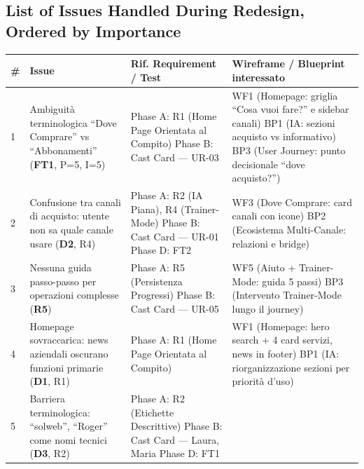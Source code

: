 ﻿\documentclass[11pt,a4paper]{article}
\begin{document}
\vspace{0.3cm}

\subsection*{List of Issues Handled During Redesign, Ordered by Importance}

\renewcommand{\arraystretch}{1.3}
\begin{longtable}{|p{0.8cm}|p{3.2cm}|p{3.3cm}|p{6.2cm}|}
\hline
\textbf{\#} & \textbf{Issue} & \textbf{Rif. Requirement / Test} & \textbf{Wireframe / Blueprint interessato} \\
\hline
\endhead
1 & Ambiguit\`a terminologica ``Dove Comprare'' vs ``Abbonamenti'' (\textbf{FT1}, P=5, I=5) 
& Phase A: R1 (Home Page Orientata al Compito) \newline Phase B: Cast Card --- UR-03
& WF1 (Homepage: griglia ``Cosa vuoi fare?'' e sidebar canali) \newline BP1 (IA: sezioni acquisto vs informativo) \newline BP3 (User Journey: punto decisionale ``dove acquisto?'') \\
\hline
2 & Confusione tra canali di acquisto: utente non sa quale canale usare (\textbf{D2}, R4) 
& Phase A: R2 (IA Piana), R4 (Trainer-Mode) \newline Phase B: Cast Card --- UR-01 \newline Phase D: FT2
& WF3 (Dove Comprare: card canali con icone) \newline BP2 (Ecosistema Multi-Canale: relazioni e bridge) \\
\hline
3 & Nessuna guida passo-passo per operazioni complesse (\textbf{R5}) 
& Phase A: R5 (Persistenza Progressi) \newline Phase B: Cast Card --- UR-05
& WF5 (Aiuto + Trainer-Mode: guida 5 passi) \newline BP3 (Intervento Trainer-Mode lungo il journey) \\
\hline
4 & Homepage sovraccarica: news aziendali oscurano funzioni primarie (\textbf{D1}, R1) 
& Phase A: R1 (Home Page Orientata al Compito)
& WF1 (Homepage: hero search + 4 card servizi, news in footer) \newline BP1 (IA: riorganizzazione sezioni per priorit\`a d'uso) \\
\hline
5 & Barriera terminologica: ``solweb'', ``Roger'' come nomi tecnici (\textbf{D3}, R2) 
& Phase A: R2 (Etichette Descrittive) \newline Phase B: Cast Card --- Laura, Maria \newline Phase D: FT1

\end{longtable}
\end{document}
